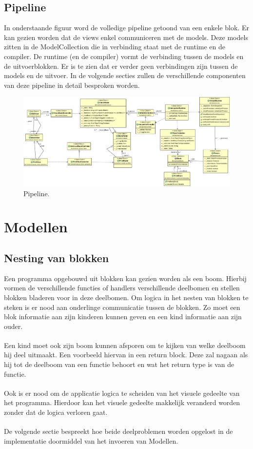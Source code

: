 \documentclass[]{article}
\begin{document}
\subsection{Pipeline}
In onderstaande figuur word de volledige pipeline getoond van een enkele blok. Er kan gezien worden dat de views enkel communiceren met de models. Deze models zitten in de ModelCollection die in verbinding staat met de runtime en de compiler. De runtime (en de compiler) vormt de verbinding tussen de models en de uitvoerblokken. Er is te zien dat er verder geen verbindingen zijn tussen de models en de uitvoer. In de volgende secties zullen de verschillende componenten van deze pipeline in detail besproken worden.
 \begin{figure}
  \centering
   
\includegraphics[scale=0.4]{./AnalyseADTAlgorithm/pipelinePrintBlock.png}
  \caption{Pipeline.} \label{gui}
\end{figure}
\clearpage


\section{Modellen}
\label{Modellen}
\subsection{Nesting van blokken}
Een programma opgebouwd uit blokken kan gezien worden als een boom. Hierbij vormen de verschillende functies of handlers verschillende deelbomen en stellen blokken bladeren voor in deze deelbomen. Om logica in het nesten van blokken te steken is er nood aan onderlinge communicatie tussen de blokken. Zo moet een blok informatie aan zijn kinderen kunnen geven en een kind informatie aan zijn ouder.\\\\
Een kind moet ook zijn boom kunnen afsporen om te kijken van welke deelboom hij deel uitmaakt. Een voorbeeld hiervan in een return block. Deze zal nagaan als hij tot de deelboom van een functie behoort en wat het return type is van de functie.\\\\
Ook is er nood om de applicatie logica te scheiden van het visuele gedeelte van het programma. Hierdoor kan het visuele gedeelte makkelijk veranderd worden zonder dat de logica verloren gaat.\\\\
De volgende sectie bespreekt hoe beide deelproblemen worden opgelost in de implementatie doormiddel van het invoeren van Modellen.
\end{document}
